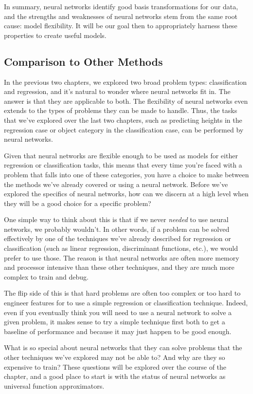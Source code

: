 In summary, neural networks identify good basis transformations for our data, and the strengths and weaknesses of neural networks stem from the same root cause: model flexibility. It will be our goal then to appropriately harness these properties to create useful models.

\subsection{Comparison to Other Methods}
In the previous two chapters, we explored two broad problem types: classification and regression, and it's natural to wonder where neural networks fit in. The answer is that they are applicable to both. The flexibility of neural networks even extends to the types of problems they can be made to handle. Thus, the tasks that we've explored over the last two chapters, such as predicting heights in the regression case or object category in the classification case, can be performed by neural networks.

Given that neural networks are flexible enough to be used as models for either regression or classification tasks, this means that every time you're faced with a problem that falls into one of these categories, you have a choice to make between the methods we've already covered or using a neural network. Before we've explored the specifics of neural networks, how can we discern at a high level when they will be a good choice for a specific problem?

One simple way to think about this is that if we never \textit{needed} to use neural networks, we probably wouldn't. In other words, if a problem can be solved effectively by one of the techniques we've already described for regression or classification (such as linear regression, discriminant functions, etc.), we would prefer to use those. The reason is that neural networks are often more memory and processor intensive than these other techniques, and they are much more complex to train and debug.

The flip side of this is that hard problems are often too complex or too hard to engineer features for to use a simple regression or classification technique. Indeed, even if you eventually think you will need to use a neural network to solve a given problem, it makes sense to try a simple technique first both to get a baseline of performance and because it may just happen to be good enough.

What is so special about neural networks that they can solve problems that the other techniques we've explored may not be able to? And why are they so expensive to train? These questions will be explored over the course of the chapter, and a good place to start is with the status of neural networks as universal function approximators.

